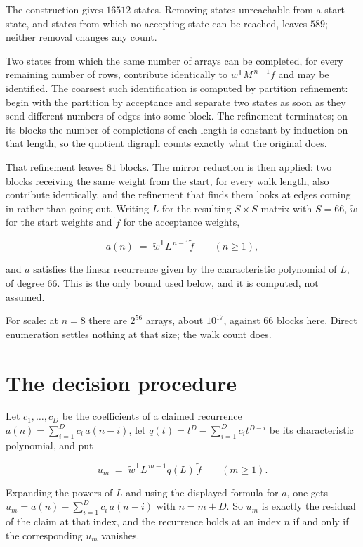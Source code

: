 \documentclass[11pt]{article}
\theoremstyle{definition}
\begin{document}
The construction gives $16512$ states. Removing states unreachable from a start state, and states from which no accepting state can be reached, leaves $589$; neither removal changes any count.

Two states from which the same number of arrays can be completed, for every remaining number of rows, contribute identically to $w^{\mathsf T}M^{\,n-1}f$ and may be identified. The coarsest such identification is computed by partition refinement: begin with the partition by acceptance and separate two states as soon as they send different numbers of edges into some block. The refinement terminates; on its blocks the number of completions of each length is constant by induction on that length, so the quotient digraph counts exactly what the original does.

That refinement leaves $81$ blocks. The mirror reduction is then applied: two blocks receiving the same weight from the start, for every walk length, also contribute identically, and the refinement that finds them looks at edges coming in rather than going out. Writing $L$ for the resulting $S \times S$ matrix with $S = 66$, $\tilde w$ for the start weights and $\tilde f$ for the acceptance weights,

\[a(n) \;=\; \tilde w^{\mathsf T} L^{\,n-1} \tilde f \qquad (n \ge 1),\]

and $a$ satisfies the linear recurrence given by the characteristic polynomial of $L$, of degree $66$. This is the only bound used below, and it is computed, not assumed.

For scale: at $n = 8$ there are $2^{56}$ arrays, about $10^{17}$, against $66$ blocks here. Direct enumeration settles nothing at that size; the walk count does.

\section{The decision procedure}

Let $c_1,\dots,c_D$ be the coefficients of a claimed recurrence $a(n) = \sum_{i=1}^{D} c_i\,a(n-i)$, let $q(t) = t^{D} - \sum_{i=1}^{D} c_i t^{D-i}$ be its characteristic polynomial, and put

\[u_m \;=\; \tilde w^{\mathsf T} L^{\,m-1} q(L)\,\tilde f \qquad (m \ge 1).\]

Expanding the powers of $L$ and using the displayed formula for $a$, one gets $u_m = a(n) - \sum_{i=1}^{D} c_i\,a(n-i)$ with $n = m + D$. So $u_m$ is exactly the residual of the claim at that index, and the recurrence holds at an index $n$ if and only if the corresponding $u_m$ vanishes.
\end{document}
